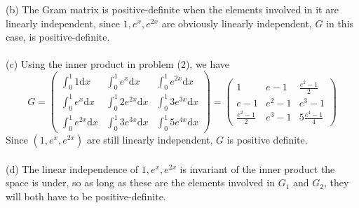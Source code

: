 \documentclass{article}
\begin{document}
(b) The Gram matrix is positive-definite when the elements involved in it are linearly independent, since $1, e^{x}, e^{2x}$ are obviously linearly independent, $G$ in this case, is positive-definite.\\\\
(c) Using the inner product in problem (2), we have
\begin{equation*}
    G = \begin{pmatrix}
        \int_{0}^{1} 1\text{d}x & \int_{0}^{1} e^{x}\text{d}x& \int_{0}^{1} e^{2x}\text{d}x\\
        \int_{0}^{1} e^{x}\text{d}x& \int_{0}^{1} 2e^{2x}\text{d}x&\int_{0}^{1} 3e^{3x}\text{d}x\\
        \int_{0}^{1} e^{2x}\text{d}x& \int_{0}^{1} 3e^{3x}\text{d}x&\int_{0}^{1} 5e^{4x}\text{d}x
    \end{pmatrix} = \begin{pmatrix}
        1 & e - 1 & \frac{e^2 - 1}{2}\\
        e - 1 & e^2 - 1 & e^3 - 1\\
         \frac{e^2 - 1}{2} & e^3 - 1 & 5\frac{e^4 - 1}{4}
    \end{pmatrix}
\end{equation*}
Since $(1, e^x, e^{2x})$ are still linearly independent, $G$ is positive definite. \\\\
(d) The linear independence of $1, e^x, e^{2x}$ is invariant of the inner product the space is under, so as long as these are the elements involved in $G_1$ and $G_2$, they will both have to be positive-definite. 

\end{document}
